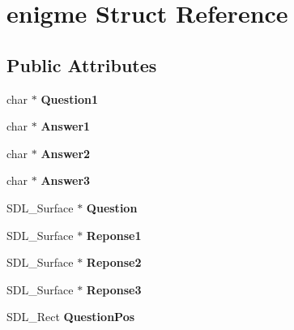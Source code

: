 \hypertarget{structenigme}{\section{enigme Struct Reference}
\label{structenigme}
}
\subsection*{Public Attributes}
\begin{DoxyCompactItemize}
\item 
\hypertarget{structenigme_a11d7c5725779097000fd80f83cda4f96}{char $\ast$ {\bfseries Question1}}\label{structenigme_a11d7c5725779097000fd80f83cda4f96}

\item 
\hypertarget{structenigme_a3eb3c7d9cd0ff72dbd314c47f13360f9}{char $\ast$ {\bfseries Answer1}}\label{structenigme_a3eb3c7d9cd0ff72dbd314c47f13360f9}

\item 
\hypertarget{structenigme_a4f8e5449f4c8daa89c71a4a957b8e3be}{char $\ast$ {\bfseries Answer2}}\label{structenigme_a4f8e5449f4c8daa89c71a4a957b8e3be}

\item 
\hypertarget{structenigme_ade34f56bb419a9d94370a4c7a6bc2771}{char $\ast$ {\bfseries Answer3}}\label{structenigme_ade34f56bb419a9d94370a4c7a6bc2771}

\item 
\hypertarget{structenigme_a917462fa7abd51385bfb39274d24c11f}{S\-D\-L\-\_\-\-Surface $\ast$ {\bfseries Question}}\label{structenigme_a917462fa7abd51385bfb39274d24c11f}

\item 
\hypertarget{structenigme_ae96e03a095ebb4ce2b3cccdeb579374f}{S\-D\-L\-\_\-\-Surface $\ast$ {\bfseries Reponse1}}\label{structenigme_ae96e03a095ebb4ce2b3cccdeb579374f}

\item 
\hypertarget{structenigme_a771517cb94802d31e721441665715e4f}{S\-D\-L\-\_\-\-Surface $\ast$ {\bfseries Reponse2}}\label{structenigme_a771517cb94802d31e721441665715e4f}

\item 
\hypertarget{structenigme_a9bdd76795cc901d09641e163dfaa8b30}{S\-D\-L\-\_\-\-Surface $\ast$ {\bfseries Reponse3}}\label{structenigme_a9bdd76795cc901d09641e163dfaa8b30}

\item 
\hypertarget{structenigme_a4e42f5239d6f2974638b198c251bf0d4}{S\-D\-L\-\_\-\-Rect {\bfseries Question\-Pos}}\label{structenigme_a4e42f5239d6f2974638b198c251bf0d4}


\end{DoxyCompactItemize}
